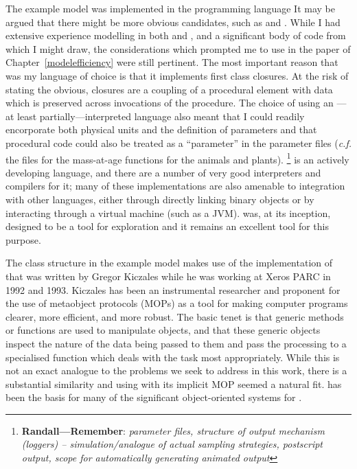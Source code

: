 The example model was implemented in the \Scheme programming language
It may be argued that there might be more obvious candidates, such as
\CC and \Cpp.  While I had extensive experience modelling in both \CC
and \Cpp, and a significant body of code from which I might draw, the
considerations which prompted me to use \Scheme in the paper of
Chapter~\ref{modelefficiency} were still pertinent. The most important
reason that \Scheme was my language of choice is that it implements
first class closures.  At the risk of stating the obvious, closures
are a coupling of a procedural element with data which is preserved
across invocations of the procedure.  The choice of using an ---at
least partially---interpreted language also meant that I could readily
encorporate both physical units and the definition of parameters and
that procedural code could also be treated as a ``parameter'' in the
parameter files (\emph{c.f.} the files for the mass-at-age functions
for the animals and plants).
\footnote{ \textbf{Randall---Remember}: \textit{parameter files, structure of output
  mechanism (loggers) -- simulation/analogue of actual sampling
  strategies, postscript output, scope for automatically generating
  animated output }}
\Scheme is an actively developing language, and
there are a number of very good interpreters and compilers for it;
many of these implementations are also amenable to integration with
other languages, either through directly linking binary objects or by
interacting through a virtual machine (such as a JVM).  \Scheme was,
at its inception, designed to be a tool for exploration
\cite{sussman1998first} and it remains an excellent tool for this
purpose. 

The class structure in the example model makes use of the \Scheme
implementation of \SCLOS that was written
by Gregor Kiczales \cite{kiczales1993xerox} while he was working at
Xeros PARC in 1992 and 1993.  Kiczales has been an instrumental
researcher and proponent for the use of metaobject protocols (MOPs) as
a tool for making computer programs clearer, more efficient, and more
robust.  The basic tenet is that generic methods or functions are used
to manipulate objects, and that these generic objects inspect the
nature of the data being passed to them and pass the processing to a
specialised function which deals with the task most appropriately.
While this is not an exact analogue to the problems we seek to address
in this work, there is a substantial similarity and using \SCLOS
with its implicit MOP seemed a natural fit.  \SCLOS has been
the basis for many of the significant object-oriented  systems for
\Scheme.

